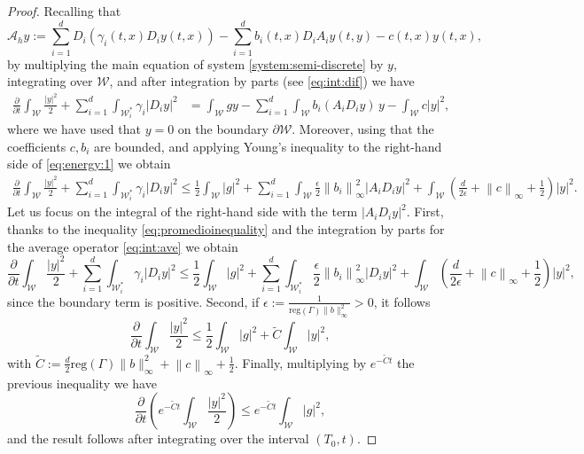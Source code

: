 \documentclass{amsart}
\numberwithin{equation}{section}
\begin{document}
\begin{proof} Recalling that 
\begin{equation}
\mathcal{A}_{h}y:= \sum_{i=1}^{d}D_{i}\left(\gamma_{i}(t,x)D_{i}y(t,x)\right)-\sum_{i=1}^{d}b_i(t,x)D_{i}A_{i}y(t,y)-c(t,x)y(t,x),
\end{equation}
by multiplying the main equation of system \eqref{system:semi-discrete} by $y$, integrating over $\mathcal{W}$, and after integration by parts (see \eqref{eq:int:dif}) we have
\begin{align}\label{eq:energy:1}
\frac{\partial}{\partial t}\int_\mathcal{W} \frac{|y|^2}{2}+\sum_{i=1}^d\int_{\mathcal{W}_i^\ast} \gamma_i|D_iy|^2&=\int_\mathcal{W} g y-\sum_{i=1}^d\int_{\mathcal{W}} b_i(A_iD_iy)\,y-\int_{\mathcal{W}}c|y|^2,
\end{align}
where we have used that $y=0$ on the boundary $\partial\mathcal{W}$. Moreover, using that the coefficients $c,b_i$ are bounded, and applying Young's inequality to the right-hand side of \eqref{eq:energy:1} we obtain
        \begin{align*}
        \frac{\partial}{\partial t}\int_\mathcal{W} \frac{|y|^2}{2}+\sum_{i=1}^d\int_{\mathcal{W}_i^\ast} \gamma_i|D_{i}y|^{2}\leq\frac{1}{2}\int_\mathcal{W}|g|^{2}+\sum_{i=1}^d\int_{\mathcal{W}}\frac{\epsilon}{2}\left\| b_{i}\right\|_{\infty}^{2}|A_{i}D_{i}y|^{2}+\int_{\mathcal{W}}\left( \frac{d}{2\epsilon}+\left\| c\right\|_{\infty}+\frac{1}{2}\right)|y|^{2}. 
    \end{align*}
    Let us focus on the integral of the right-hand side with the term $|A_{i}D_{i}y|^{2}$. First, thanks to the inequality \eqref{eq:promedioinequality} and the integration by parts for the average operator \eqref{eq:int:ave} we obtain
    \begin{equation*}
        \frac{\partial}{\partial t}\int_\mathcal{W} \frac{|y|^2}{2}+\sum_{i=1}^d\int_{\mathcal{W}_i^\ast} \gamma_i|D_{i}y|^{2}\leq\frac{1}{2}\int_\mathcal{W}|g|^{2}+\sum_{i=1}^d\int_{\mathcal{W}^{\ast}_{i}}\frac{\epsilon}{2}\left\| b_{i}\right\|_{\infty}^{2}|D_{i}y|^{2}+\int_{\mathcal{W}}\left(\frac{d}{2\epsilon}+\left\| c\right\|_{\infty}+\frac{1}{2}\right)|y|^{2},
    \end{equation*}
since the boundary term is positive. Second, if $\epsilon:= \frac{1}{\mbox {reg}(\Gamma)\|b\|^2_\infty}>0$, it follows 
       \begin{equation*}
        \frac{\partial}{\partial t}\int_\mathcal{W} \frac{|y|^2}{2}\leq\frac{1}{2}\int_\mathcal{W}|g|^{2}+\tilde{C}\int_{\mathcal{W}}|y|^{2},
    \end{equation*}
    with $\tilde{C}:= \frac{d}{2}\mbox {reg}(\Gamma)\|b\|^2_\infty+\left\| c\right\|_{\infty}+\frac{1}{2}$. Finally, multiplying by $e^{-\tilde{C}t}$ the previous inequality we have
        \begin{equation*}
        \frac{\partial}{\partial t}\left( e^{-\tilde{C}t}\int_\mathcal{W} \frac{|y|^2}{2}\right)\leq e^{-\tilde{C}t}\int_\mathcal{W}|g|^{2},
    \end{equation*}
    and the result follows after integrating over the interval $(T_{0},t)$.
\end{proof}
\end{document}
